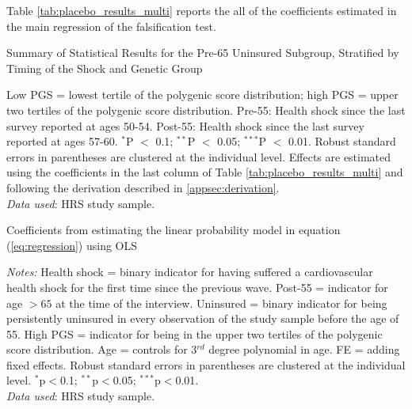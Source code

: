 Table \ref{tab:placebo_results_multi} reports the all of the coefficients estimated in the main regression of the falsification test.

\begin{table}[!ht]
	\caption{Summary of Statistical Results for the Pre-65 Uninsured Subgroup, Stratified by Timing of the Shock and Genetic Group}
	\label{tab:placebo_effects}
	
		\begin{flushleft}
			Low PGS = lowest tertile of the polygenic score distribution; high PGS = upper two tertiles of the polygenic score distribution.
			Pre-55: Health shock since the last survey reported at ages 50-54.
			Post-55: Health shock since the last survey reported at ages 57-60.
			$^{*}$P $<$ 0.1; $^{**}$P $<$ 0.05; $^{***}$P $<$ 0.01. Robust standard errors in parentheses are clustered at the individual level.
			Effects are estimated using the coefficients in the last column of Table \ref{tab:placebo_results_multi} and following the derivation described in \ref{appsec:derivation}.\\
			\textit{Data used}: HRS study sample.
		\end{flushleft}
\end{table}


\begin{table}[!ht] \centering
	\caption{Coefficients from estimating the linear probability model in equation (\ref{eq:regression}) using OLS\vspace{-0.4cm}}
	\addtolength{\tabcolsep}{-7pt}
	\label{tab:placebo_results_multi}
	\resizebox{0.55\textheight}{!}{
	
	} %
	\begin{flushleft}
	\textit{Notes:}
	Health shock = binary indicator for having suffered a cardiovascular health shock for the first time since the previous wave.
	Post-55 = indicator for age $> 65$ at the time of the interview.
	Uninsured = binary indicator for being persistently uninsured in every observation of the study sample before the age of 55.
	High PGS = indicator for being in the upper two tertiles of the polygenic score distribution.
    Age = controls for 3$^{rd}$ degree polynomial in age.
    FE = adding fixed effects.
	Robust standard errors in parentheses are clustered at the individual level.
	$^{*}$p$<$0.1; $^{**}$p$<$0.05; $^{***}$p$<$0.01.
	\\ \textit{Data used}: HRS study sample.
	\end{flushleft}
\end{table}


